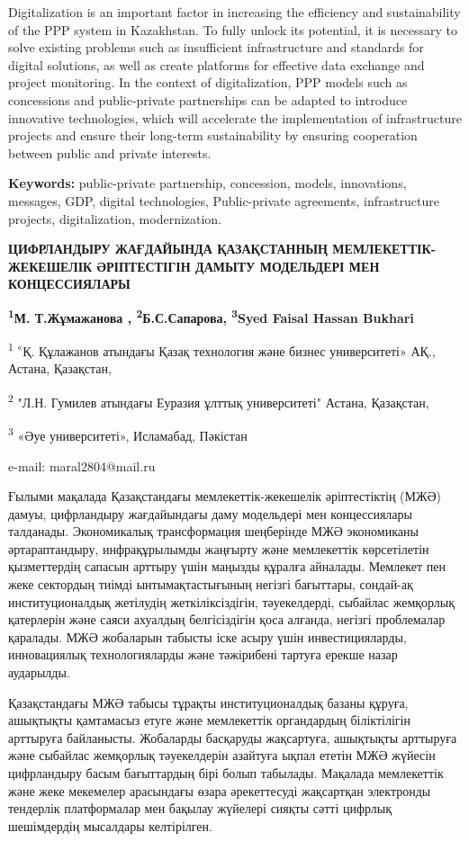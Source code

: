 Digitalization is an important factor in increasing the efficiency and
sustainability of the PPP system in Kazakhstan. To fully unlock its
potential, it is necessary to solve existing problems such as
insufficient infrastructure and standards for digital solutions, as well
as create platforms for effective data exchange and project monitoring.
In the context of digitalization, PPP models such as concessions and
public-private partnerships can be adapted to introduce innovative
technologies, which will accelerate the implementation of infrastructure
projects and ensure their long-term sustainability by ensuring
cooperation between public and private interests.

{\bfseries Keywords:} public-private partnership, concession, models,
innovations, messages, GDP, digital technologies, Public-private
agreements, infrastructure projects, digitalization, modernization.

{\bfseries ЦИФРЛАНДЫРУ ЖАҒДАЙЫНДА ҚАЗАҚСТАННЫҢ МЕМЛЕКЕТТІК-ЖЕКЕШЕЛІК
ӘРІПТЕСТІГІН ДАМЫТУ МОДЕЛЬДЕРІ МЕН КОНЦЕССИЯЛАРЫ}

{\bfseries \textsuperscript{1}М. Т.Жұмажанова\textsuperscript{\envelope } ,
\textsuperscript{2}Б.С.Сапарова, \textsuperscript{3}Syed Faisal Hassan
Bukhari}

\textsuperscript{1 «}Қ. Құлажанов атындағы Қазақ технология және бизнес
университеті» АҚ., Астана, Қазақстан,

\textsuperscript{2} "Л.Н. Гумилев атындағы Еуразия ұлттық университеті"
Астана, Қазақстан,

\textsuperscript{3} «Әуе университеті», Исламабад, Пәкістан

e-mail: maral2804@mail.ru

Ғылыми мақалада Қазақстандағы мемлекеттік-жекешелік әріптестіктің (МЖӘ)
дамуы, цифрландыру жағдайындағы даму модельдері мен концессиялары
талданады. Экономикалық трансформация шеңберінде МЖӘ экономиканы
әртараптандыру, инфрақұрылымды жаңғырту және мемлекеттік көрсетілетін
қызметтердің сапасын арттыру үшін маңызды құралға айналады. Мемлекет пен
жеке сектордың тиімді ынтымақтастығының негізгі бағыттары, сондай-ақ
институционалдық жетілудің жеткіліксіздігін, тәуекелдерді, сыбайлас
жемқорлық қатерлерін және саяси ахуалдың белгісіздігін қоса алғанда,
негізгі проблемалар қаралады. МЖӘ жобаларын табысты іске асыру үшін
инвестицияларды, инновациялық технологияларды және тәжірибені тартуға
ерекше назар аударылды.

Қазақстандағы МЖӘ табысы тұрақты институционалдық базаны құруға,
ашықтықты қамтамасыз етуге және мемлекеттік органдардың біліктілігін
арттыруға байланысты. Жобаларды басқаруды жақсартуға, ашықтықты
арттыруға және сыбайлас жемқорлық тәуекелдерін азайтуға ықпал ететін МЖӘ
жүйесін цифрландыру басым бағыттардың бірі болып табылады. Мақалада
мемлекеттік және жеке мекемелер арасындағы өзара әрекеттесуді жақсартқан
электронды тендерлік платформалар мен бақылау жүйелері сияқты сәтті
цифрлық шешімдердің мысалдары келтірілген.

